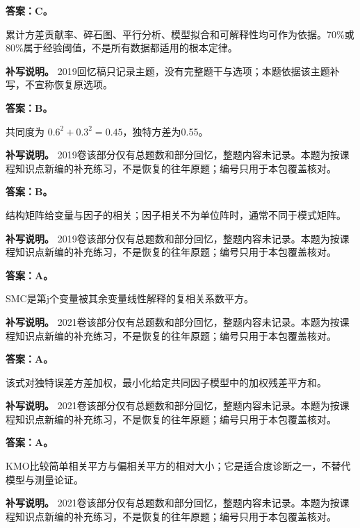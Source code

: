 
\textbf{答案：C。}

累计方差贡献率、碎石图、平行分析、模型拟合和可解释性均可作为依据。70\%或80\%属于经验阈值，不是所有数据都适用的根本定律。


\textbf{补写说明。} 2019回忆稿只记录主题，没有完整题干与选项；本题依据该主题补写，不宣称恢复原选项。



\textbf{答案：B。}

共同度为 \(0.6^2+0.3^2=0.45\)，独特方差为0.55。


\textbf{补写说明。} 2019卷该部分仅有总题数和部分回忆，整题内容未记录。本题为按课程知识点新编的补充练习，不是恢复的往年原题；编号只用于本包覆盖核对。



\textbf{答案：B。}

结构矩阵给变量与因子的相关；因子相关不为单位阵时，通常不同于模式矩阵。


\textbf{补写说明。} 2019卷该部分仅有总题数和部分回忆，整题内容未记录。本题为按课程知识点新编的补充练习，不是恢复的往年原题；编号只用于本包覆盖核对。



\textbf{答案：A。}

SMC是第j个变量被其余变量线性解释的复相关系数平方。


\textbf{补写说明。} 2021卷该部分仅有总题数和部分回忆，整题内容未记录。本题为按课程知识点新编的补充练习，不是恢复的往年原题；编号只用于本包覆盖核对。



\textbf{答案：A。}

该式对独特误差方差加权，最小化给定共同因子模型中的加权残差平方和。


\textbf{补写说明。} 2021卷该部分仅有总题数和部分回忆，整题内容未记录。本题为按课程知识点新编的补充练习，不是恢复的往年原题；编号只用于本包覆盖核对。



\textbf{答案：A。}

KMO比较简单相关平方与偏相关平方的相对大小；它是适合度诊断之一，不替代模型与测量论证。


\textbf{补写说明。} 2021卷该部分仅有总题数和部分回忆，整题内容未记录。本题为按课程知识点新编的补充练习，不是恢复的往年原题；编号只用于本包覆盖核对。



